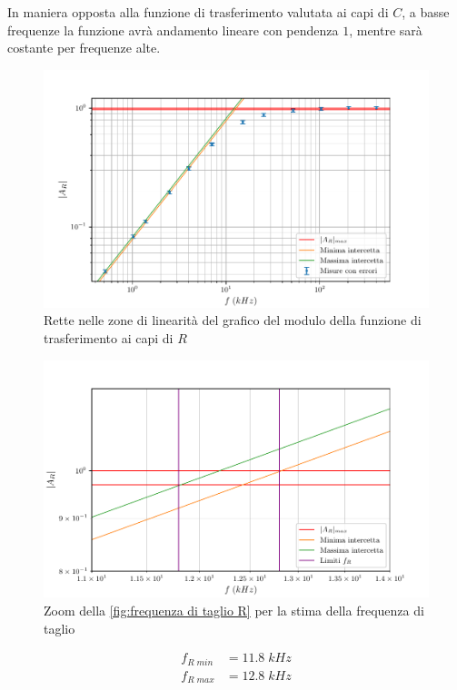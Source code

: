 \documentclass[11pt, a4paper]{article}
\numberwithin{equation}{section} %
\begin{document}
In maniera opposta alla funzione di trasferimento valutata ai capi di $C$, a basse frequenze la funzione avrà andamento lineare con pendenza $1$, mentre sarà costante per frequenze alte.

\begin{figure}[ht!]
    \includegraphics{onda_sin_AR(f)_taglio.pdf}
    \caption{Rette nelle zone di linearità del grafico del modulo della funzione di trasferimento ai capi di $R$}
    \label{fig:frequenza di taglio R}
\end{figure}

\newpage

\begin{figure}[ht!]
    \includegraphics{onda_sin_AR(f)_taglio_frequenza.pdf}
    \caption{Zoom della \autoref{fig:frequenza di taglio R} per la stima della frequenza di taglio}
    \label{fig:frequenza di taglio R zoom}
\end{figure}

\begin{align*}
    f_{R \; min} &= 11.8 \; kHz \\
    f_{R \; max} &= 12.8 \; kHz
\end{align*}
\end{document}
